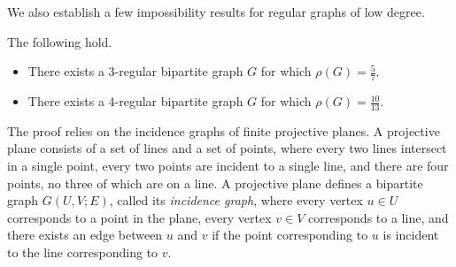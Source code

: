 \documentclass{toc}
\theoremstyle{plain}
\begin{document}
%
%
%
%

%
%
%
%

%
%
%
%
%
%
%

We also establish a few impossibility results for regular graphs of low degree.

\begin{theorem}
	The following hold.  %
	\begin{itemize}
		\item There exists a $3$-regular bipartite graph $G$ for which $\rho(G) = \frac{5}{7}$.
		\item There exists a $4$-regular bipartite graph $G$ for which $\rho(G) = \frac{10}{13}$.
	\end{itemize}
	\label{thm:imposs-projective}
\end{theorem}

%
%
%
The proof relies on %
the incidence graphs of finite  %
projective planes.
A projective plane consists of a set of lines and a set of points, where
%
every two lines intersect in a single point, %
every two points are incident to a single line,
and there are four points, no three of which are on a line.  %
A projective plane %
defines %
a bipartite graph $G(U,V;E)$,
called its \emph{incidence graph},  %
where every vertex $u \in U$ corresponds to a point in the plane, every vertex $v \in V$ corresponds to a line, and there exists an edge between $u$ and $v$ if the point corresponding to $u$ is incident to the line corresponding to $v$.
\end{document}
